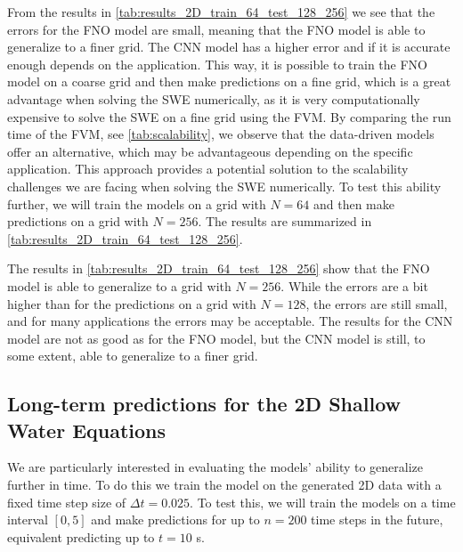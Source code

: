 From the results in \autoref{tab:results_2D_train_64_test_128_256} we see that the errors for the FNO model are small, meaning that the FNO model is able to generalize to a finer grid.
The CNN model has a higher error and if it is accurate enough depends on the application.
This way, it is possible to train the FNO model on a coarse grid and then make predictions on a fine grid, which is a great advantage when solving the SWE numerically, as it is very computationally expensive to solve the SWE on a fine grid using the FVM.
By comparing the run time of the FVM, see \autoref{tab:scalability}, we observe that the data-driven models offer an alternative, which may be advantageous depending on the specific application.
This approach provides a potential solution to the scalability challenges we are facing when solving the SWE numerically.
To test this ability further, we will train the models on a grid with $N = 64$ and then make predictions on a grid with $N = 256$.
The results are summarized in \autoref{tab:results_2D_train_64_test_128_256}.

The results in \autoref{tab:results_2D_train_64_test_128_256} show that the FNO model is able to generalize to a grid with $N = 256$.
While the errors are a bit higher than for the predictions on a grid with $N = 128$, the errors are still small, and for many applications the errors may be acceptable.
The results for the CNN model are not as good as for the FNO model, but the CNN model is still, to some extent, able to generalize to a finer grid.

\subsection{Long-term predictions for the 2D Shallow Water Equations}
We are particularly interested in evaluating the models' ability to generalize further in time.
To do this we train the model on the generated 2D data with a fixed time step size of $\Delta t = 0.025$.
To test this, we will train the models on a time interval $[0, 5]$ and make predictions for up to $n = 200$ time steps in the future, equivalent predicting up to $t = 10$ s.

